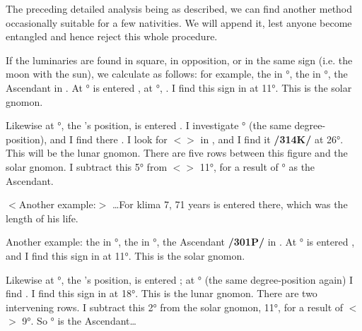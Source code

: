 The preceding detailed analysis being as described, we can find another method occasionally suitable for a few nativities. We will append it, lest anyone become entangled and hence reject this whole
procedure. 

If the luminaries are found in square, in opposition, or in the same sign (i.e. the moon with the sun), we calculate as follows: for example, the \Sun\xspace in \Sagittarius\xspace 30°, the \Moon\xspace in \Sagittarius\xspace 25°, the Ascendant in \Virgo. At \Sagittarius\xspace 30° is entered \Aries, at \Aries\xspace 30°, \Scorpio. I find this sign in \Virgo\xspace at 11°. This is the solar gnomon. 

Likewise at \Sagittarius\xspace 25°, the \Moon’s position, is entered \Scorpio.  I investigate \Scorpio\xspace 25° (the same degree-position), and I find there \Gemini. I look for $<$\Gemini$>$ in \Virgo, and I find it \textbf{/314K/} at 26°. This will be the lunar gnomon. There are five rows between this figure and the solar gnomon. I subtract this 5° from $<$\Virgo$>$ 11°, for a result of ° as the Ascendant. 

$<$Another example:$>$ …For klima 7, 71 years is entered there, which was the length of his life.

Another example: the \Sun\xspace in \Sagittarius\xspace 3°, the \Moon\xspace in \Sagittarius\xspace 7°, the Ascendant \textbf{/301P/} in \Libra. At \Sagittarius\xspace 3° is entered \Sagittarius, and I find this sign in \Libra\xspace at 11°. This is the solar gnomon. 

Likewise at \Sagittarius\xspace 7°, the \Moon’s position, is entered \Cancer; at \Cancer\xspace 7° (the same degree-position again) I find \Aries. I find this sign in \Libra\xspace at 18°. This is the lunar gnomon. There are two intervening rows. I subtract this 2° from the solar gnomon, 11°, for a result of $<$\Libra$>$ 9°. So \Libra\xspace
9° is the Ascendant…

